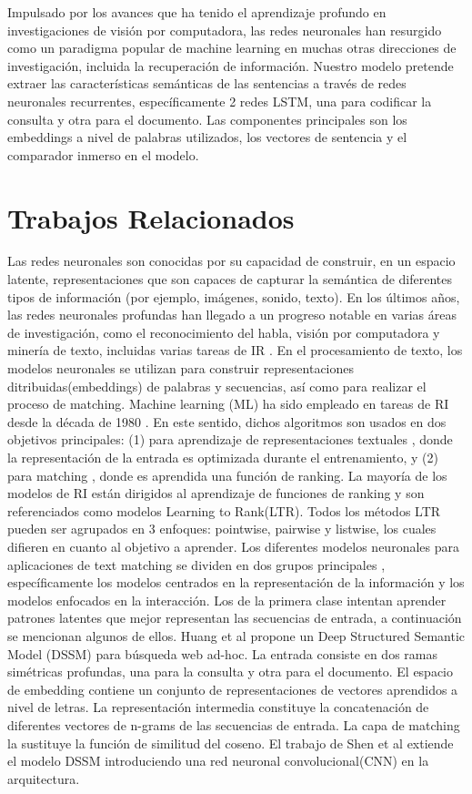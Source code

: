 \documentclass{llncs}
\begin{document}
Impulsado por los avances que ha tenido el aprendizaje profundo en investigaciones de visión por computadora, las redes neuronales han resurgido como un paradigma popular de machine learning en muchas otras direcciones de investigación, incluida la recuperación de información. Nuestro modelo pretende extraer las características semánticas de las sentencias a través de redes neuronales recurrentes, específicamente 2 redes LSTM, una para codificar la consulta y otra para el documento. Las componentes principales son los embeddings a nivel de palabras utilizados, los vectores de sentencia y el comparador inmerso en el modelo. 
%
\section{Trabajos Relacionados}
%
Las redes neuronales son conocidas por su capacidad de construir, en un espacio latente, representaciones que son capaces de capturar la semántica de diferentes tipos de información (por ejemplo, imágenes, sonido, texto). En los últimos años, las redes neuronales profundas han llegado a un progreso notable en varias áreas de investigación, como el reconocimiento del habla, visión por computadora y minería de texto, incluidas varias tareas de IR \cite{11}. En el procesamiento de texto, los modelos neuronales se utilizan para construir representaciones ditribuidas(embeddings) de palabras y secuencias, así como para realizar el proceso de matching.
Machine learning (ML) ha sido empleado en tareas de RI desde la década de 1980 \cite{206}. En este sentido, dichos algoritmos son usados en dos objetivos principales: (1) para aprendizaje de representaciones textuales \cite{12}\cite{55}, donde la representación de la entrada es optimizada durante el entrenamiento, y (2) para matching \cite{185,207}, donde es aprendida una función de ranking. La mayoría de los modelos de RI están dirigidos al aprendizaje de funciones de ranking \cite{205,208,209,210,211} y son referenciados como modelos Learning to Rank(LTR). Todos los métodos LTR pueden ser agrupados \cite{207} en 3 enfoques: pointwise, pairwise y listwise, los cuales difieren en cuanto al objetivo a aprender. 
Los diferentes modelos neuronales para aplicaciones de text matching se dividen en dos grupos principales \cite{178}, específicamente los modelos centrados en la representación de la información y los modelos enfocados en la interacción. Los de la primera clase intentan aprender patrones latentes que mejor representan las secuencias de entrada, a continuación se mencionan algunos de ellos.
Huang et al \cite{16} propone un Deep Structured Semantic Model (DSSM) para búsqueda web ad-hoc. La entrada consiste en dos ramas simétricas profundas, una para la consulta y otra para el documento. El espacio de embedding contiene un conjunto de representaciones de vectores aprendidos a nivel de letras. La representación intermedia constituye la concatenación de diferentes vectores de n-grams de las secuencias de entrada. La capa de matching la sustituye la función de similitud del coseno. El trabajo de Shen et al \cite{237} extiende el modelo DSSM introduciendo una red neuronal convolucional(CNN) en la arquitectura.
\end{document}
